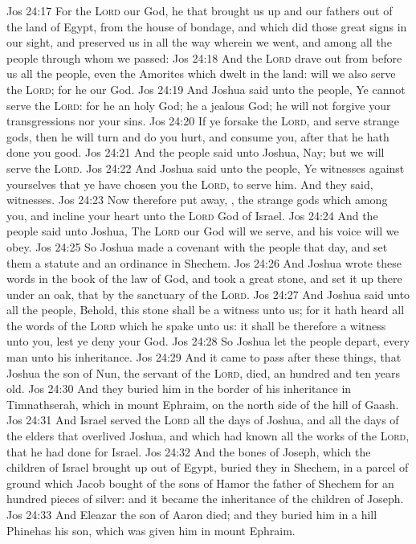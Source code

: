 \vs Jos 24:17 For the \textsc{Lord} our God, he  that brought us up and our fathers out of the land of Egypt, from the house of bondage, and which did those great signs in our sight, and preserved us in all the way wherein we went, and among all the people through whom we passed:
\vs Jos 24:18 And the \textsc{Lord} drave out from before us all the people, even the Amorites which dwelt in the land:  will we also serve the \textsc{Lord}; for he  our God.
\vs Jos 24:19 And Joshua said unto the people, Ye cannot serve the \textsc{Lord}: for he  an holy God; he  a jealous God; he will not forgive your transgressions nor your sins.
\vs Jos 24:20 If ye forsake the \textsc{Lord}, and serve strange gods, then he will turn and do you hurt, and consume you, after that he hath done you good.
\vs Jos 24:21 And the people said unto Joshua, Nay; but we will serve the \textsc{Lord}.
\vs Jos 24:22 And Joshua said unto the people, Ye  witnesses against yourselves that ye have chosen you the \textsc{Lord}, to serve him. And they said,  witnesses.
\vs Jos 24:23 Now therefore put away, , the strange gods which  among you, and incline your heart unto the \textsc{Lord} God of Israel.
\vs Jos 24:24 And the people said unto Joshua, The \textsc{Lord} our God will we serve, and his voice will we obey.
\vs Jos 24:25 So Joshua made a covenant with the people that day, and set them a statute and an ordinance in Shechem.
\vs Jos 24:26 And Joshua wrote these words in the book of the law of God, and took a great stone, and set it up there under an oak, that  by the sanctuary of the \textsc{Lord}.
\vs Jos 24:27 And Joshua said unto all the people, Behold, this stone shall be a witness unto us; for it hath heard all the words of the \textsc{Lord} which he spake unto us: it shall be therefore a witness unto you, lest ye deny your God.
\vs Jos 24:28 So Joshua let the people depart, every man unto his inheritance.
\vs Jos 24:29 And it came to pass after these things, that Joshua the son of Nun, the servant of the \textsc{Lord}, died,  an hundred and ten years old.
\vs Jos 24:30 And they buried him in the border of his inheritance in Timnathserah, which  in mount Ephraim, on the north side of the hill of Gaash.
\vs Jos 24:31 And Israel served the \textsc{Lord} all the days of Joshua, and all the days of the elders that overlived Joshua, and which had known all the works of the \textsc{Lord}, that he had done for Israel.
\vs Jos 24:32 And the bones of Joseph, which the children of Israel brought up out of Egypt, buried they in Shechem, in a parcel of ground which Jacob bought of the sons of Hamor the father of Shechem for an hundred pieces of silver: and it became the inheritance of the children of Joseph.
\vs Jos 24:33 And Eleazar the son of Aaron died; and they buried him in a hill  Phinehas his son, which was given him in mount Ephraim.
